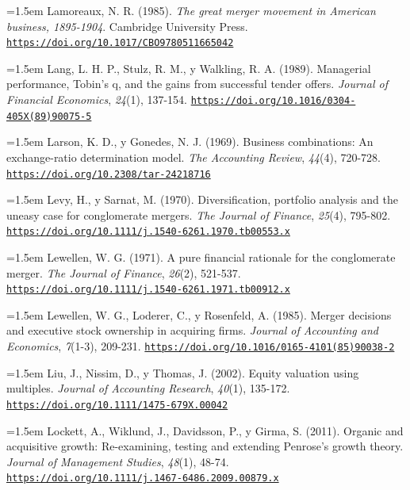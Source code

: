 \documentclass[10pt,a4paper]{article}
\begin{document}
\noindent\hangindent=1.5em Lamoreaux, N. R. (1985). \textit{The great merger movement in American business, 1895-1904}. Cambridge University Press. \href{https://doi.org/10.1017/CBO9780511665042}{\nolinkurl{https://doi.org/10.1017/CBO9780511665042}}

\noindent\hangindent=1.5em Lang, L. H. P., Stulz, R. M., y Walkling, R. A. (1989). Managerial performance, Tobin's q, and the gains from successful tender offers. \textit{Journal of Financial Economics}, \textit{24}(1), 137-154. \href{https://doi.org/10.1016/0304-405X(89)90075-5}{\nolinkurl{https://doi.org/10.1016/0304-405X(89)90075-5}}

\noindent\hangindent=1.5em Larson, K. D., y Gonedes, N. J. (1969). Business combinations: An exchange-ratio determination model. \textit{The Accounting Review}, \textit{44}(4), 720-728. \href{https://doi.org/10.2308/tar-24218716}{\nolinkurl{https://doi.org/10.2308/tar-24218716}}

\noindent\hangindent=1.5em Levy, H., y Sarnat, M. (1970). Diversification, portfolio analysis and the uneasy case for conglomerate mergers. \textit{The Journal of Finance}, \textit{25}(4), 795-802. \href{https://doi.org/10.1111/j.1540-6261.1970.tb00553.x}{\nolinkurl{https://doi.org/10.1111/j.1540-6261.1970.tb00553.x}}

\noindent\hangindent=1.5em Lewellen, W. G. (1971). A pure financial rationale for the conglomerate merger. \textit{The Journal of Finance}, \textit{26}(2), 521-537. \href{https://doi.org/10.1111/j.1540-6261.1971.tb00912.x}{\nolinkurl{https://doi.org/10.1111/j.1540-6261.1971.tb00912.x}}

\noindent\hangindent=1.5em Lewellen, W. G., Loderer, C., y Rosenfeld, A. (1985). Merger decisions and executive stock ownership in acquiring firms. \textit{Journal of Accounting and Economics}, \textit{7}(1-3), 209-231. \href{https://doi.org/10.1016/0165-4101(85)90038-2}{\nolinkurl{https://doi.org/10.1016/0165-4101(85)90038-2}}

\noindent\hangindent=1.5em Liu, J., Nissim, D., y Thomas, J. (2002). Equity valuation using multiples. \textit{Journal of Accounting Research}, \textit{40}(1), 135-172. \href{https://doi.org/10.1111/1475-679X.00042}{\nolinkurl{https://doi.org/10.1111/1475-679X.00042}}

\noindent\hangindent=1.5em Lockett, A., Wiklund, J., Davidsson, P., y Girma, S. (2011). Organic and acquisitive growth: Re-examining, testing and extending Penrose's growth theory. \textit{Journal of Management Studies}, \textit{48}(1), 48-74. \href{https://doi.org/10.1111/j.1467-6486.2009.00879.x}{\nolinkurl{https://doi.org/10.1111/j.1467-6486.2009.00879.x}}
\end{document}
